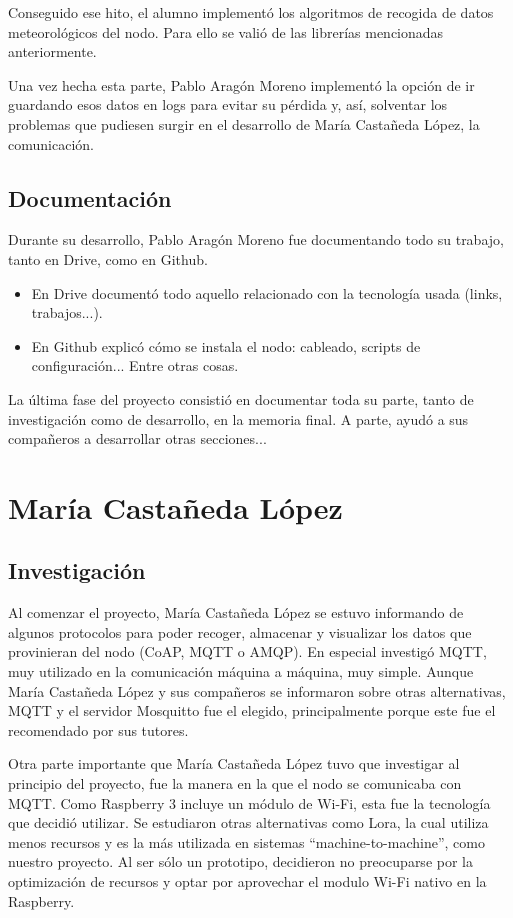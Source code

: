Conseguido ese hito, el alumno implementó los algoritmos de recogida de datos meteorológicos del nodo. Para ello se valió de las librerías mencionadas anteriormente.

Una vez hecha esta parte, Pablo Aragón Moreno implementó la opción de ir guardando esos datos en logs para evitar su pérdida y, así, solventar los problemas que pudiesen surgir en el desarrollo de María Castañeda López, la comunicación.

\subsection{Documentación}
Durante su desarrollo, Pablo Aragón Moreno fue documentando todo su trabajo, tanto en Drive, como en Github.
\begin{itemize}
\item En Drive documentó todo aquello relacionado con la tecnología usada (links, trabajos...).
\item En Github explicó cómo se instala el nodo: cableado, scripts de configuración... Entre otras cosas. 
\end{itemize}
La última fase del proyecto consistió en documentar toda su parte, tanto de investigación como de desarrollo, en la memoria final. A parte, ayudó a sus compañeros a desarrollar otras secciones... 

\section{María Castañeda López}
\subsection{Investigación}
Al comenzar el proyecto, María Castañeda López se estuvo informando de algunos protocolos para poder recoger, almacenar y visualizar los datos que provinieran del nodo (CoAP, MQTT o AMQP). En especial investigó MQTT, muy utilizado en la comunicación máquina a máquina, muy simple. Aunque María Castañeda López y sus compañeros se informaron sobre otras alternativas, MQTT y el servidor Mosquitto fue el elegido, principalmente porque este fue el recomendado por sus tutores. 

Otra parte importante que María Castañeda López tuvo que investigar al principio del proyecto, fue la manera en la que el nodo se comunicaba con MQTT. Como Raspberry 3 incluye un módulo de Wi-Fi, esta fue la tecnología que decidió utilizar. Se estudiaron otras alternativas como Lora, la cual utiliza menos recursos y es la más utilizada en sistemas ``machine-to-machine'', como nuestro proyecto. Al ser sólo un prototipo, decidieron no preocuparse por la optimización de recursos y optar por aprovechar el modulo Wi-Fi nativo en la Raspberry.

